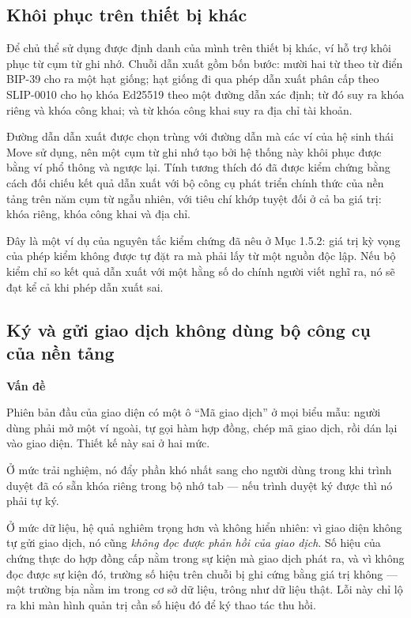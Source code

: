 \subsection{Khôi phục trên thiết bị khác}

Để chủ thể sử dụng được định danh của mình trên thiết bị khác, ví hỗ trợ khôi phục từ cụm từ ghi nhớ. Chuỗi dẫn xuất gồm bốn bước: mười hai từ theo từ điển BIP-39 \cite{BIP39} cho ra một hạt giống; hạt giống đi qua phép dẫn xuất phân cấp theo SLIP-0010 cho họ khóa Ed25519 \cite{SLIP0010} theo một đường dẫn xác định; từ đó suy ra khóa riêng và khóa công khai; và từ khóa công khai suy ra địa chỉ tài khoản.

Đường dẫn dẫn xuất được chọn trùng với đường dẫn mà các ví của hệ sinh thái Move sử dụng, nên một cụm từ ghi nhớ tạo bởi hệ thống này khôi phục được bằng ví phổ thông và ngược lại. Tính tương thích đó đã được kiểm chứng bằng cách đối chiếu kết quả dẫn xuất với bộ công cụ phát triển chính thức của nền tảng trên năm cụm từ ngẫu nhiên, với tiêu chí khớp tuyệt đối ở cả ba giá trị: khóa riêng, khóa công khai và địa chỉ.

Đây là một ví dụ của nguyên tắc kiểm chứng đã nêu ở Mục 1.5.2: giá trị kỳ vọng của phép kiểm không được tự đặt ra mà phải lấy từ một nguồn độc lập. Nếu bộ kiểm chỉ so kết quả dẫn xuất với một hằng số do chính người viết nghĩ ra, nó sẽ đạt kể cả khi phép dẫn xuất sai.

\subsection{Ký và gửi giao dịch không dùng bộ công cụ của nền tảng}

\noindent \textbf{Vấn đề}

Phiên bản đầu của giao diện có một ô {``}Mã giao dịch{''} ở mọi biểu mẫu: người dùng phải mở một ví ngoài, tự gọi hàm hợp đồng, chép mã giao dịch, rồi dán lại vào giao diện. Thiết kế này sai ở hai mức.

Ở mức trải nghiệm, nó đẩy phần khó nhất sang cho người dùng trong khi trình duyệt đã có sẵn khóa riêng trong bộ nhớ tab --- nếu trình duyệt ký được thì nó phải tự ký.

Ở mức dữ liệu, hệ quả nghiêm trọng hơn và không hiển nhiên: vì giao diện không tự gửi giao dịch, nó cũng \emph{không đọc được phản hồi của giao dịch}. Số hiệu của chứng thực do hợp đồng cấp nằm trong sự kiện mà giao dịch phát ra, và vì không đọc được sự kiện đó, trường số hiệu trên chuỗi bị ghi cứng bằng giá trị không --- một trường bịa nằm im trong cơ sở dữ liệu, trông như dữ liệu thật. Lỗi này chỉ lộ ra khi màn hình quản trị cần số hiệu đó để ký thao tác thu hồi.

